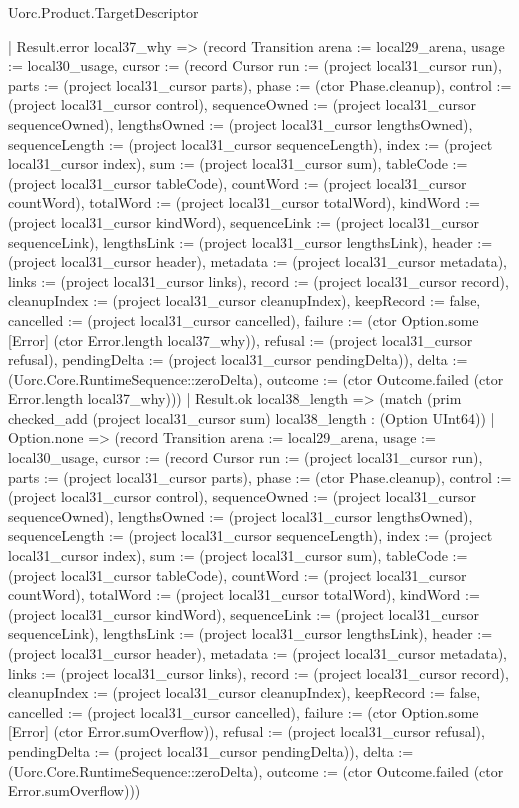 \begin{lexlean}{Uorc.Product.TargetDescriptor}
\begin{semanticmodule}
{      | Result.error local37_why => (record Transition {arena := local29_arena, usage := local30_usage, cursor := (record Cursor {run := (project local31_cursor run), parts := (project local31_cursor parts), phase := (ctor Phase.cleanup), control := (project local31_cursor control), sequenceOwned := (project local31_cursor sequenceOwned), lengthsOwned := (project local31_cursor lengthsOwned), sequenceLength := (project local31_cursor sequenceLength), index := (project local31_cursor index), sum := (project local31_cursor sum), tableCode := (project local31_cursor tableCode), countWord := (project local31_cursor countWord), totalWord := (project local31_cursor totalWord), kindWord := (project local31_cursor kindWord), sequenceLink := (project local31_cursor sequenceLink), lengthsLink := (project local31_cursor lengthsLink), header := (project local31_cursor header), metadata := (project local31_cursor metadata), links := (project local31_cursor links), record := (project local31_cursor record), cleanupIndex := (project local31_cursor cleanupIndex), keepRecord := false, cancelled := (project local31_cursor cancelled), failure := (ctor Option.some [Error] (ctor Error.length local37_why)), refusal := (project local31_cursor refusal), pendingDelta := (project local31_cursor pendingDelta)}), delta := (Uorc.Core.RuntimeSequence::zeroDelta), outcome := (ctor Outcome.failed (ctor Error.length local37_why))})
      | Result.ok local38_length => (match (prim checked_add (project local31_cursor sum) local38_length : (Option UInt64))
        | Option.none => (record Transition {arena := local29_arena, usage := local30_usage, cursor := (record Cursor {run := (project local31_cursor run), parts := (project local31_cursor parts), phase := (ctor Phase.cleanup), control := (project local31_cursor control), sequenceOwned := (project local31_cursor sequenceOwned), lengthsOwned := (project local31_cursor lengthsOwned), sequenceLength := (project local31_cursor sequenceLength), index := (project local31_cursor index), sum := (project local31_cursor sum), tableCode := (project local31_cursor tableCode), countWord := (project local31_cursor countWord), totalWord := (project local31_cursor totalWord), kindWord := (project local31_cursor kindWord), sequenceLink := (project local31_cursor sequenceLink), lengthsLink := (project local31_cursor lengthsLink), header := (project local31_cursor header), metadata := (project local31_cursor metadata), links := (project local31_cursor links), record := (project local31_cursor record), cleanupIndex := (project local31_cursor cleanupIndex), keepRecord := false, cancelled := (project local31_cursor cancelled), failure := (ctor Option.some [Error] (ctor Error.sumOverflow)), refusal := (project local31_cursor refusal), pendingDelta := (project local31_cursor pendingDelta)}), delta := (Uorc.Core.RuntimeSequence::zeroDelta), outcome := (ctor Outcome.failed (ctor Error.sumOverflow))})
}
\end{semanticmodule}
\end{lexlean}
